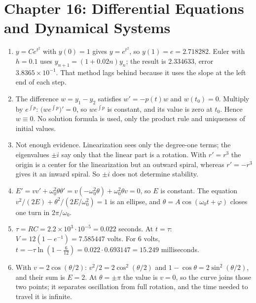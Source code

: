 
\section*{Chapter 16: Differential Equations and Dynamical Systems}
\begin{enumerate}[label=\textbf{16.\arabic*}]
  \item $y=Ce^{t^{2}}$ with $y(0)=1$ gives $y=e^{t^{2}}$, so $y(1)=e=2.718282$.
        Euler with $h=0.1$ uses $y_{n+1}=(1+0.02n)y_{n}$; the result is $2.334633$,
        error $3.8365\times10^{-1}$. That method lags behind because it uses
        the slope at the left end of each step.

  \item The difference $w=y_{1}-y_{2}$ satisfies $w'=-p(t)w$ and $w(t_{0})=0$. Multiply
        by $e^{\int p}$: $\bigl(we^{\int p}\bigr)'=0$, so $we^{\int p}$ is constant, and
        its value is zero at $t_{0}$. Hence $w\equiv0$. No solution formula is used,
        only the product rule and uniqueness of initial values.

  \item Not enough evidence. Linearization sees only the degree-one terms; the
        eigenvalues $\pm i$ say only that the linear part is a rotation. With $r'=r^{3}$
        the origin is a center for the linearization but an outward spiral, whereas
        $r'=-r^{3}$ gives it an inward spiral. So $\pm i$ does not determine stability.

  \item $E'=vv'+\omega_{0}^{2}\theta\theta'=v(-\omega_{0}^{2}\theta)+\omega_{0}^{2}\theta
        v=0$, so $E$ is constant. The equation $v^{2}/(2E)+\theta^{2}/(2E/\omega_{0}^{2})=1$
        is an ellipse, and $\theta=A\cos(\omega_{0}t+\varphi)$ closes one turn
        in $2\pi/\omega_{0}$.

  \item $\tau=RC=2.2\times10^{3}\cdot10^{-5}=0.022$ seconds. At $t=\tau$:
        $V=12(1-e^{-1})=7.585447$ volts. For $6$ volts, $t=-\tau\ln(1-\tfrac{6}{12})
        =0.022\cdot0.693147=15.249$ milliseconds.

  \item With $v=2\cos(\theta/2)$: $v^{2}/2=2\cos^{2}(\theta/2)$ and
        $1-\cos\theta=2\sin^{2}(\theta/2)$, and their sum is $E=2$. At $\theta=\pm\pi$
        the value is $v=0$, so the curve joins those two points; it separates
        oscillation from full rotation, and the time needed to travel it is infinite.


\end{enumerate}
